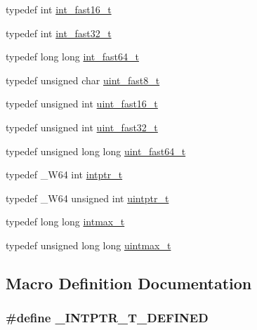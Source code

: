 \begin{DoxyCompactItemize}
\item 
typedef int \hyperlink{stdint_8h_afc08556e35ad5fc42968cf164e7852d4}{int\-\_\-fast16\-\_\-t}
\item 
typedef int \hyperlink{stdint_8h_a9db34f43e43298cb4db12999aec7c4be}{int\-\_\-fast32\-\_\-t}
\item 
typedef long long \hyperlink{stdint_8h_a8cc97d26bc4fc9f0856ce7e143f9cea9}{int\-\_\-fast64\-\_\-t}
\item 
typedef unsigned char \hyperlink{stdint_8h_a2d31063fef649c85396fb28130ef9795}{uint\-\_\-fast8\-\_\-t}
\item 
typedef unsigned int \hyperlink{stdint_8h_a226d967fb6d06433caf43f20dc876aae}{uint\-\_\-fast16\-\_\-t}
\item 
typedef unsigned int \hyperlink{stdint_8h_a633264eb9df8f0520acccbbfb406f806}{uint\-\_\-fast32\-\_\-t}
\item 
typedef unsigned long long \hyperlink{stdint_8h_ab107742eefdd49f98cb8710e84e48dd2}{uint\-\_\-fast64\-\_\-t}
\item 
typedef \-\_\-\-W64 int \hyperlink{stdint_8h_a8849b1e6d66a4902c0ac1d257a0a91f0}{intptr\-\_\-t}
\item 
typedef \-\_\-\-W64 unsigned int \hyperlink{stdint_8h_a31b85deecb45924320becd11d3ee16ce}{uintptr\-\_\-t}
\item 
typedef long long \hyperlink{stdint_8h_ac3686a882b6a4aadded1cd099caeffef}{intmax\-\_\-t}
\item 
typedef unsigned long long \hyperlink{stdint_8h_a7a2602e0499e20f22c546863d174f5a9}{uintmax\-\_\-t}
\end{DoxyCompactItemize}


\subsection{Macro Definition Documentation}
\subsubsection[{\-\_\-\-I\-N\-T\-P\-T\-R\-\_\-\-T\-\_\-\-D\-E\-F\-I\-N\-E\-D}]{\setlength{\rightskip}{0pt plus 5cm}\#define \-\_\-\-I\-N\-T\-P\-T\-R\-\_\-\-T\-\_\-\-D\-E\-F\-I\-N\-E\-D}\label{stdint_8h_a3ce96ec9d1fcd8dfccadb47145718f9d}
